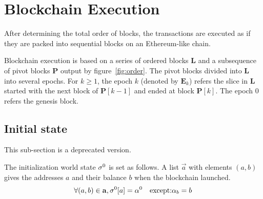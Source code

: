 

\section{Blockchain Execution}

After determining the total order of blocks, the transactions are executed as if they are packed into sequential blocks on an Ethereum-like chain. 

Blockchain execution is based on a series of ordered blocks $\mathbf{L}$ and a subsequence of pivot blocks $\mathbf{P}$ output by figure~\ref{fig:order}. 
%
The pivot blocks divided into $\mathbf{L}$ into several epochs.  For $k\ge 1$, the epoch $k$ (denoted by $\mathbf{E}_k$) refers the slice in $\mathbf{L}$ started with the next block of $\mathbf{P}[k-1]$ and ended at block $\mathbf{P}[k]$. The epoch 0 refers the genesis block. 


\subsection{Initial state}

{\color{red} This sub-section is a deprecated version.}

The initialization world state $\mathbf{\sigma}^0$ is set as follows. A list $\vec{a}$ with elements $(a,b)$ gives the addresses $a$ and their balance $b$ when the \name blockchain launched.  
\begin{align}
	\forall (a,b)\in \mathbf{a}, \mathbf{\sigma}^0[a]= \mathbf{\alpha}^0 \quad \mbox{except:} \mathbf{\alpha}_b=b 
\end{align}



